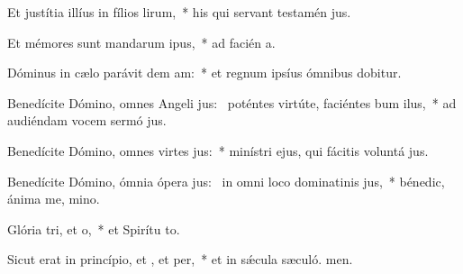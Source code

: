 \item Et justítia illíus in fílios lirum,~* his qui servant testamén jus.
\item Et mémores sunt mandarum ipus,~* ad facién a.
\item Dóminus in cælo parávit dem am:~* et regnum ipsíus ómnibus dobitur.
\item Benedícite Dómino, omnes Angeli jus:~\pscross{} poténtes virtúte, faciéntes bum ilus,~* ad audiéndam vocem sermó jus.
\item Benedícite Dómino, omnes virtes jus:~* minístri ejus, qui fácitis voluntá jus.
\item Benedícite Dómino, ómnia ópera jus:~\pscross{} in omni loco dominatinis jus,~* bénedic, ánima me, mino.
\item Glória tri, et o,~* et Spirítu to.
\item Sicut erat in princípio, et , et per,~* et in sǽcula sæculó. men.
